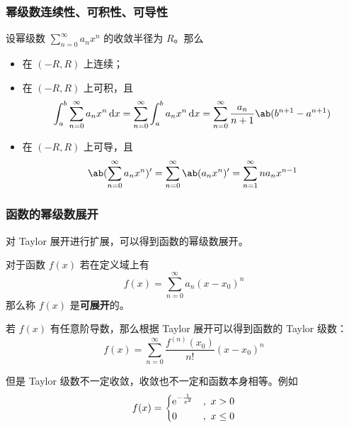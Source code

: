 \subsubsection{幂级数连续性、可积性、可导性}

\begin{theorem}[连续性定理]
    设幂级数 $\sum\limits_{n = 0}^{\infty} a_n x^{n}$ 的收敛半径为 $R$。那么
    \begin{itemize}
        \item 在 $(-R, R)$ 上连续；
        \item 在 $(-R, R)$ 上可积，且
        $$ 
        \int_a^b \sum_{n = 0}^{\infty} a_n x^{n} \dd{x} = \sum_{n = 0}^{\infty} \int_a^b a_n x^{n} \dd{x} = \sum_{n = 0}^{\infty} \frac{a_n}{n + 1} \ab(b^{n + 1} - a^{n + 1})
        $$ 
        \item 在 $(-R, R)$ 上可导，且
        $$ 
        \ab(\sum_{n = 0}^{\infty} a_n x^{n})' = \sum_{n = 0}^{\infty} \ab(a_n x^{n})' = \sum_{n = 1}^{\infty} n a_n x^{n - 1}
        $$ 
    \end{itemize}
\end{theorem}

\subsubsection{函数的幂级数展开}

对 Taylor 展开进行扩展，可以得到函数的幂级数展开。

\begin{definition}
    对于函数 $f(x)$ 若在定义域上有
    $$
    f(x) = \sum_{n = 0}^{\infty} a_n (x - x_0)^{n}
    $$
    那么称 $f(x)$ 是\textbf{可展开}的。
\end{definition}

若 $f(x)$ 有任意阶导数，那么根据 Taylor 展开可以得到函数的 Taylor 级数：
$$
f(x) = \sum_{n = 0}^{\infty} \frac{f^{(n)}(x_0)}{n!} (x - x_0)^{n}
$$

但是 Taylor 级数不一定收敛，收敛也不一定和函数本身相等。例如
$$
f(x) = \begin{dcases}
    \mathrm{e}^{-\frac{1}{x^2}} & ,\ x > 0 \\
    0 & ,\ x \le 0
\end{dcases}
$$
